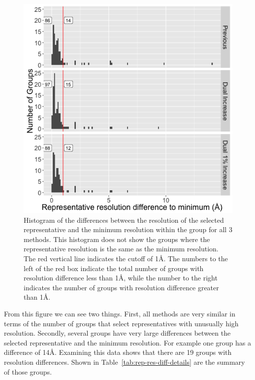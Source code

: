 \begin{figure}
  \includegraphics[width=0.5\linewidth]{chapter-4/figs/res-diff}
  \caption{Histogram of the differences between the resolution of the selected
    representative and the minimum resolution within the group for all 3
    methods. This histogram does not show the groups where the representative
    resolution is the same as the minimum resolution.  The red vertical line
    indicates the cutoff of 1{\AA}. The numbers to the left of the red box indicate
    the total number of groups with resolution difference less than 1{\AA}, while
    the number to the right indicates the number of groups with resolution
  difference greater than 1{\AA}.}
\label{fig:res-diff-histogram}
\end{figure}

From this figure we can see two things. First, all methods are very similar in
terms of the number of groups that select representatives with unusually high
resolution. Secondly, several groups have very large differences between the
selected representative and the minimum resolution. For example one group has a
difference of 14\AA. Examining this data shows that there are 19 groups with
resolution differences. Shown in Table~\ref{tab:rep-res-diff-details} are the
summary of those groups.

